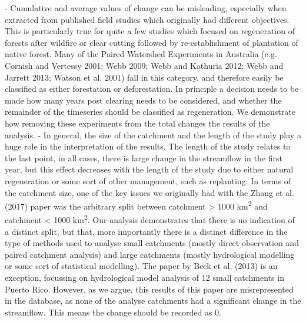 \documentclass[]{elsarticle} %
\begin{document}
- Cumulative and average values of change can be misleading, especially when extracted from published field studies which originally had different objectives. This is particularly true for quite a few studies which focused on regeneration of forests after wildfire or clear cutting followed by re-establishment of plantation of native forest. Many of the Paired Watershed Experiments in Australia (e.g. Cornish and Vertessy 2001; Webb 2009; Webb and Kathuria 2012; Webb and Jarrett 2013; Watson et al. 2001) fall in this category, and therefore easily be classified as either forestation or deforestation. In principle a decision needs to be made how many years post clearing needs to be considered, and whether the remainder of the timeseries should be classified as regeneration. We demonstrate how removing these experiments from the total changes the results of the analysis.
- In general, the size of the catchment and the length of the study play a huge role in the interpretation of the results. The length of the study relates to the last point, in all cases, there is large change in the streamflow in the first year, but this effect decreases with the length of the study due to either natural regeneration or some sort of other management, such as replanting. In terms of the catchment size, one of the key issues we originally had with the Zhang et al. (2017) paper was the arbitrary split between catchment \textgreater{} 1000 km\textsuperscript{2} and catchment \textless{} 1000 km\textsuperscript{2}. Our analysis demonstrates that there is no indication of a distinct split, but that, more importantly there is a distinct difference in the type of methods used to analyse small catchments (mostly direct observation and paired catchment analysis) and large catchments (mostly hydrological modelling or some sort of statistical modelling). The paper by Beck et al. (2013) is an exception, focussing on hydrological model analysis of 12 small catchments in Puerto Rico. However, as we argue, this results of this paper are misrepresented in the database, as none of the analyse catchments had a significant change in the streamflow. This means the change should be recorded as 0.\\
\strut \\
\end{document}
